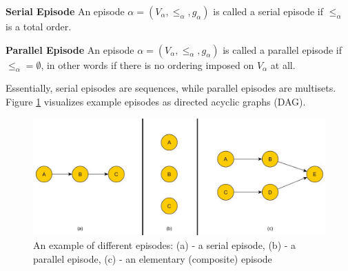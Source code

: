\begin{mydef}
\label{def_serialEpisode}
\textbf{Serial Episode} An episode $\alpha = (V_\alpha,{\leq}_{\alpha},g_\alpha)$ is called a serial episode if ${\leq}_{\alpha}$ is a total order. \cite{mannila1995discovering}
\end{mydef}

\begin{mydef}
\label{def_parallelEpisode}
\textbf{Parallel Episode} An episode $\alpha = (V_\alpha,{\leq}_{\alpha},g_\alpha)$ is called a parallel episode if ${\leq}_{\alpha} = \emptyset$, in other words if there is no ordering imposed on $V_\alpha$ at all. \cite{mannila1995discovering}
\end{mydef}

Essentially, serial episodes are sequences, while parallel episodes are multisets. Figure \ref{fig_exampleEpisodes} visualizes example episodes as directed acyclic graphs (DAG).

\begin{figure}[h]
	\centering
  	\includegraphics[width=\textwidth]{exampleEpisodes}
	\caption{An example of different episodes: (a) - a serial episode, (b) - a parallel episode, (c) - an elementary (composite) episode}
	\label{fig_exampleEpisodes}
\end{figure}

%

